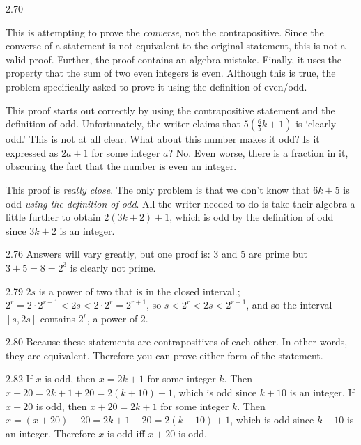 \begin{Answer}{2.70}
\begin{pfevalenum}
\item
This is attempting to prove the {\em converse}, not the contrapositive.
Since the converse of a statement is not equivalent to the original statement, this is not a valid proof.
Further, the proof contains an algebra mistake.
Finally, it uses the property that the sum of two even integers is even.  Although this is true, the problem
specifically asked to prove it using the definition of even/odd.
\item
This proof starts out correctly by using the contrapositive statement and the definition of odd.
Unfortunately, the writer claims that $\displaystyle 5(\frac{6}{5}k+1)$ is `clearly odd.'
This is not at all clear.  What about this number makes it odd?  Is it expressed as $2a+1$ for
some integer $a$?  No.
Even worse, there is a fraction in it, obscuring the fact that the number is even an integer.
\item
This proof is {\em really close}.  The only problem is that we don't know that $6k+5$ is odd
{\em using the definition of odd}.  All the writer needed to do is take their algebra a little
further to obtain $2(3k+2)+1$, which is odd by the definition of odd since $3k+2$ is an integer.
\end{pfevalenum}
\end{Answer}
\begin{Answer}{2.76}
Answers will vary greatly, but one proof is: $3$ and $5$ are prime but $3+5=8=2^3$ is clearly not prime.
\end{Answer}
\begin{Answer}{2.79}
  $2s$ is a power of two that is in the closed interval.;
$2^r=2\cdot 2^{r-1}< 2s<2\cdot 2^r=2^{r+1}$, so
$s< 2^r < 2s < 2^{r+1}$, and so the interval $[s,2s]$ contains $2^r$,
a power of $2$.
\end{Answer}
\begin{Answer}{2.80}
Because these statements are contrapositives of each other.  In other words, they are equivalent.
Therefore you can prove either form of the statement.
\end{Answer}
\begin{Answer}{2.82}
If $x$ is odd, then $x=2k+1$ for some integer $k$.
Then $x+20=2k+1+20=2(k+10)+1$, which is odd since $k+10$ is an integer.
If $x+20$ is odd, then $x+20=2k+1$ for some integer $k$.  Then $x=(x+20)-20=2k+1-20=2(k-10)+1$,
which is odd since $k-10$ is an integer.
Therefore $x$ is odd iff $x+20$ is odd.
\end{Answer}
